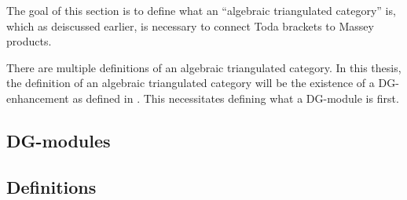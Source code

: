 The goal of this section is to define what an ``algebraic triangulated category'' is, which as deiscussed earlier, is necessary to connect Toda brackets to Massey products.

There are multiple definitions of an algebraic triangulated category. In this thesis, the definition of an algebraic triangulated category will be the existence of a DG-enhancement as defined in \cite[Definition 3.1.3]{Jasso-Muro_2023}. This necessitates defining what a DG-module is first.

\subsection{DG-modules}


\subsection{Definitions}

